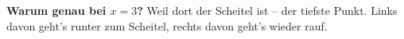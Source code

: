 \documentclass[12pt, a4paper]{article}
\begin{document}
\begin{center}
\fbox{%
    \parbox{0.7\textwidth}{%
        \centering
        $f$ ist \textbf{monoton fallend} auf $(-\infty,\, 3]$

        \vspace{0.3em}
        $f$ ist \textbf{monoton steigend} auf $[3,\, +\infty)$
    }%
}
\end{center}

\textbf{Warum genau bei $x = 3$?} Weil dort der Scheitel ist -- der tiefste Punkt. Links davon geht's runter zum Scheitel, rechts davon geht's wieder rauf.
\end{document}
